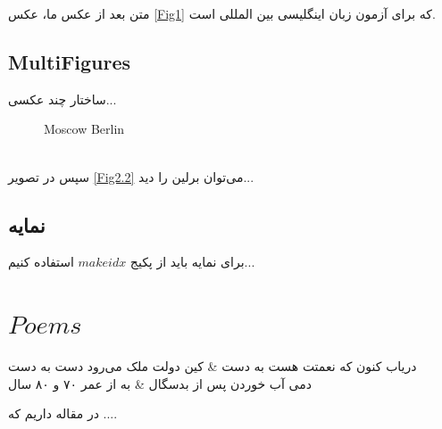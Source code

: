 \documentclass{book}
\begin{document}
متن بعد از عکس ما، عکس \ref{Fig1}
که برای آزمون زبان اینگلیسی بین المللی است.
\vspace*{3cm}

\section{MultiFigures}
ساختار چند عکسی...
\begin{figure}[h!]
	\begin{center}
	\hspace*{1cm}
	\end{center}
	\caption{ Moscow  Berlin}
\end{figure}
\\
سپس در تصویر \ref{Fig2.2}
می‌توان برلین را دید...
\section{نمایه}
برای نمایه باید از پکیج $ makeidx$
استفاده کنیم...
\chapter{$Poems$}

\begin{traditionalpoem}
	دریاب کنون که نعمتت هست به دست & 
	کین دولت ملک می‌رود دست به دست \\
	دمی آب خوردن پس از بدسگال &
	به از عمر ۷۰ و ۸۰ سال \\

\end{traditionalpoem}
در مقاله \cite{S21W} داریم که ....
\end{document}
